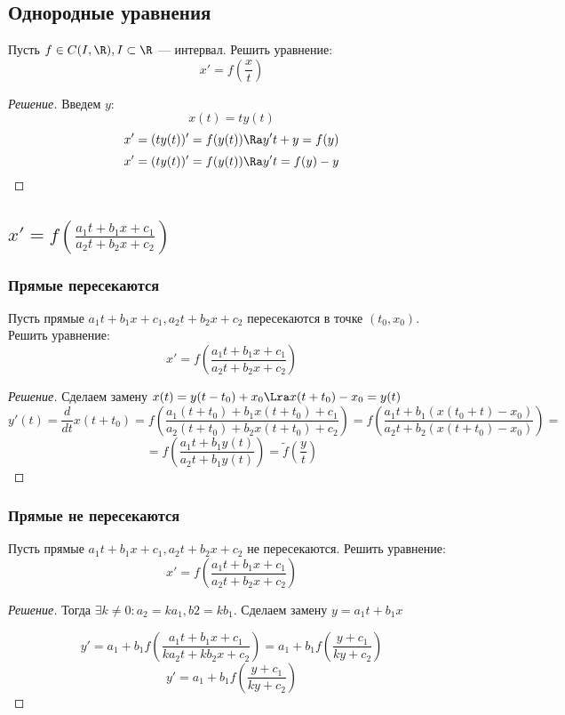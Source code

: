 
\subsection{Однородные уравнения}
\begin{problem}
    Пусть \(f \in C(I, \R), I \subset \R\) --- интервал. Решить уравнение:
    \[x' = f\left(\frac{x}{t}\right)\]
\end{problem}
\begin{proof}[Решение]
    Введем \(y\): \[x(t) = ty(t)\]
    \[x' = (ty(t))' = f(y(t)) \Ra y't + y = f(y)\]
    \[x' = (ty(t))' = f(y(t)) \Ra y't = f(y) - y\]
\end{proof}

\subsection{\(x' = f\left(\frac{a_1t + b_1x + c_1}{a_2t + b_2x + c_2}\right)\)}
\subsubsection{Прямые пересекаются}
\begin{problem}
    Пусть прямые \(a_1t + b_1x + c_1, a_2t + b_2x + c_2\) пересекаются в точке \((t_0, x_0)\). Решить уравнение:
    \[x' = f\left(\frac{a_1t + b_1x + c_1}{a_2t + b_2x + c_2}\right)\]
\end{problem}
\begin{proof}[Решение]
    Сделаем замену \(x(t) = y(t - t_0) + x_0 \Lra x(t + t_0) - x_0 = y(t)\)
    \[y'(t) = \frac{d}{dt}x(t + t_0) = f\left(\frac{a_1(t + t_0) + b_1x(t + t_0) + c_1}{a_2(t + t_0) + b_2x(t + t_0) + c_2}\right) = f\left(\frac{a_1t + b_1(x(t_0 + t) - x_0)}{a_2t + b_2(x(t + t_0) - x_0)}\right)=\]
    \[ = f\left(\frac{a_1t + b_1y(t)}{a_2t + b_1y(t)}\right) = \tilde{f}\left(\frac{y}{t}\right)\]
\end{proof}

\subsubsection{Прямые не пересекаются}
\begin{problem}
    Пусть прямые \(a_1t + b_1x + c_1, a_2t + b_2x + c_2\) не пересекаются. Решить уравнение:
    \[x' = f\left(\frac{a_1t + b_1x + c_1}{a_2t + b_2x + c_2}\right)\]
\end{problem}
\begin{proof}[Решение]
    Тогда \(\exists k \ne 0: a_2 = ka_1, b2 = kb_1\). Сделаем замену \(y = a_1t + b_1x\)

    \[y' = a_1 + b_1f\left(\frac{a_1t + b_1x + c_1}{ka_2t + kb_2x + c_2}\right) = a_1 + b_1f\left(\frac{y + c_1}{ky + c_2}\right)\]
    \[y' = a_1 + b_1f\left(\frac{y + c_1}{ky + c_2}\right)\]
\end{proof}

